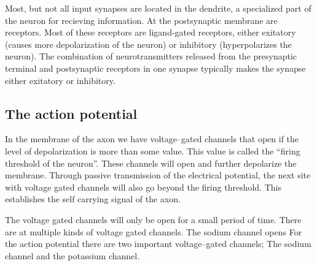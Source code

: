Most, but not all input synapses are located in the dendrite, a specialized part of the neuron for recieving information. 
At the postsynaptic membrane are receptors. Most of these receptors are ligand-gated receptors, either exitatory (causes more depolarization of the neuron) or inhibitory (hyperpolarizes the neuron). 
The combination of neurotransmitters released from the presynaptic terminal and postsynaptic receptors in one synapse typically makes the synapse either exitatory or inhibitory.


\subsection{The action potential}
\label{ssecTheActionPotential}
In the membrane of the axon we have voltage--gated channels that open if the level of depolarization is more than some value. This value is called the ``firing threshold of the neuron''.
These channels will open and further depolarize the membrane. Through passive transmission of the electrical potential, the next site with voltage gated channels will also go beyond the firing threshold.
This establishes the self carrying signal of the axon.
%

The voltage gated channels will only be open for a small period of time.
There are at multiple kinds of voltage gated channels. The sodium channel opens
For the action potential there are two important voltage--gated channels; The sodium channel and the potassium channel.

